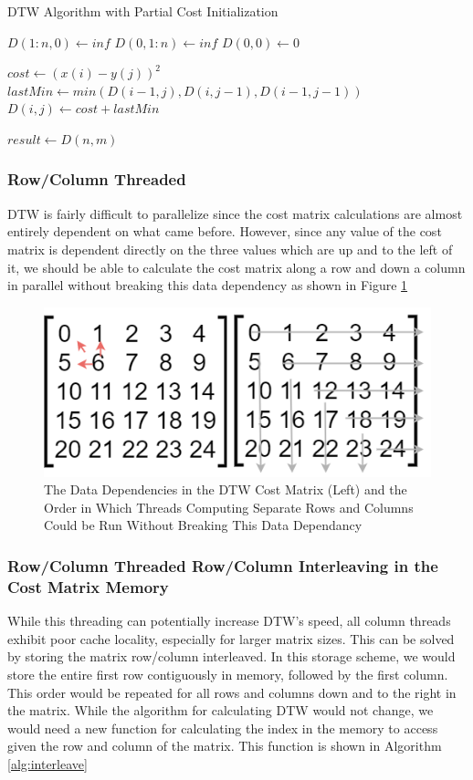\documentclass[sigconf,authordraft]{acmart}
\begin{document}
\begin{algorithm}
\caption{DTW Algorithm with Partial Cost Initialization}\label{alg:pinit}
\begin{algorithmic}

\State $D(1:n, 0) \gets inf$
\State $D(0, 1:n) \gets inf$
\State $D(0, 0) \gets 0$

        \State $cost \gets (x(i) - y(j))^2$
        \State $lastMin \gets min(D(i-1,j), D(i,j-1),D(i-1,j-1))$
        \State $D(i,j) \gets cost + lastMin$
    \EndFor
\EndFor

\State $result \gets D(n,m)$
\end{algorithmic}
\end{algorithm}

\subsubsection{Row/Column Threaded}

DTW is fairly difficult to parallelize since the cost matrix calculations are almost entirely dependent on what came before. However, since any value of the cost matrix is dependent directly on the three values which are up and to the left of it, we should be able to calculate the cost matrix along a row and down a column in parallel without breaking this data dependency as shown in Figure \ref{fig:thread}

\begin{figure}
    \centering
    \includegraphics[width=0.8\linewidth]{img/thread_order.png}
    \caption{The Data Dependencies in the DTW Cost Matrix (Left) and the Order in Which Threads Computing Separate Rows and Columns Could be Run Without Breaking This Data Dependancy}
    \label{fig:thread}
\end{figure}

\subsubsection{Row/Column Threaded Row/Column Interleaving in the Cost Matrix Memory}
While this threading can potentially increase DTW's speed, all column threads exhibit poor cache locality, especially for larger matrix sizes. This can be solved by storing the matrix row/column interleaved. In this storage scheme, we would store the entire first row contiguously in memory, followed by the first column. This order would be repeated for all rows and columns down and to the right in the matrix. While the algorithm for calculating DTW would not change, we would need a new function for calculating the index in the memory to access given the row and column of the matrix. This function is shown in Algorithm \ref{alg:interleave}
\end{document}
